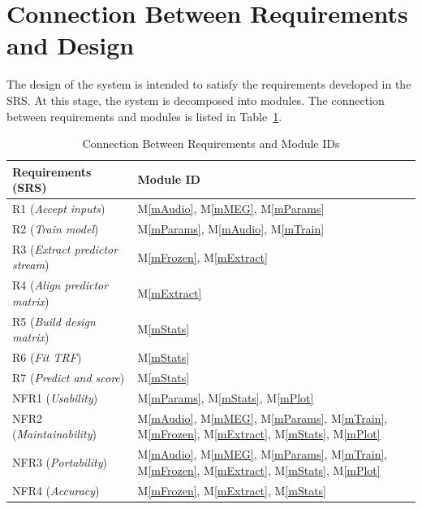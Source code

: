 \documentclass[12pt, titlepage]{article}
\newcommand{\mref}[1]{M\ref{#1}}
\begin{document}
\section{Connection Between Requirements and Design} \label{SecConnection}

The design of the system is intended to satisfy the requirements developed in the SRS. At this stage, the system is decomposed into modules. The connection between requirements and modules is listed in Table~\ref{TblConnection}.

\begin{table}[H]
\centering
\begin{tabular}{p{} p{}}
\toprule
\textbf{Requirements (SRS)} & \textbf{Module ID}\\
\midrule
R1 (\textit{Accept inputs}) 
& \mref{mAudio}, \mref{mMEG}, \mref{mParams} \\

R2 (\textit{Train model}) 
& \mref{mParams}, \mref{mAudio}, \mref{mTrain} \\

R3 (\textit{Extract predictor stream}) 
& \mref{mFrozen}, \mref{mExtract} \\

R4 (\textit{Align predictor matrix}) 
& \mref{mExtract} \\

R5 (\textit{Build design matrix}) 
& \mref{mStats} \\

R6 (\textit{Fit TRF}) 
& \mref{mStats} \\

R7 (\textit{Predict and score}) 
& \mref{mStats} \\

NFR1 (\textit{Usability}) 
& \mref{mParams}, \mref{mStats}, \mref{mPlot} \\

NFR2 (\textit{Maintainability}) 
& \mref{mAudio}, \mref{mMEG}, \mref{mParams}, \mref{mTrain}, \mref{mFrozen}, \mref{mExtract}, \mref{mStats}, \mref{mPlot} \\

NFR3 (\textit{Portability}) 
& \mref{mAudio}, \mref{mMEG}, \mref{mParams}, \mref{mTrain}, \mref{mFrozen}, \mref{mExtract}, \mref{mStats}, \mref{mPlot} \\

NFR4 (\textit{Accuracy}) 
& \mref{mFrozen}, \mref{mExtract}, \mref{mStats} \\
\bottomrule
\end{tabular}
\caption{Connection Between Requirements and Module IDs}
\label{TblConnection}
\end{table}
\end{document}
